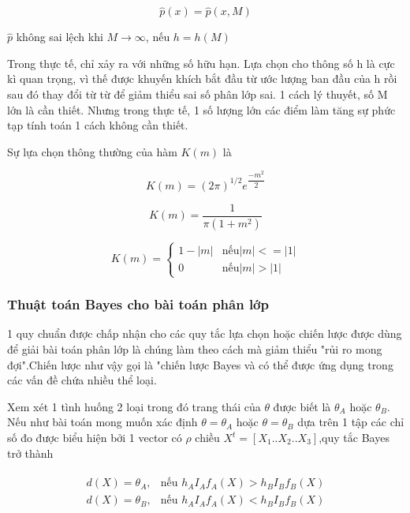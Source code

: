 \begin{equation}
	\hat{p}(x)=\hat{p}(x,M)
\end{equation}

$\hat{p}$  không sai lệch khi $M \rightarrow \infty$, nếu $h=h(M)$

Trong thực tế, chỉ xảy ra với những số hữu hạn. Lựa chọn cho thông số h là cực kì quan trọng, vì thế được khuyến khích bắt đầu từ ước lượng ban đầu của h rồi sau đó thay đổi từ từ để giảm thiểu sai số phân lớp sai. 1 cách lý thuyết, số M lớn là cần thiết. Nhưng trong thực tế, 1 số lượng lớn các điểm làm tăng sự phức tạp tính toán 1 cách không cần thiết.

\vspace{\baselineskip}
Sự lựa chọn thông thường của hàm $K(m)$ là

\begin{equation}
	K(m)=(2\pi)^{1/2}e^{\dfrac{-m^2}{2}}
\end{equation}

\begin{equation}
	K(m)=\dfrac{1}{\pi (1+m^2)}
\end{equation}

$$
K(m)=
\begin{cases}
	1-|m| & \text{nếu} |m|<=|1|\\
	0 & \text{nếu} |m|>|1|
\end{cases}
$$

\subsubsection{Thuật toán Bayes cho bài toán phân lớp}
1 quy chuẩn được chấp nhận cho các quy tắc lựa chọn hoặc chiến lược được dùng để giải bài toán phân lớp là chúng làm theo cách mà giảm thiểu "rủi ro mong đợi".Chiến lược như vậy gọi là "chiến lược Bayes và có thể được ứng dụng trong các vấn đề chứa nhiều thể loại.
 
\vspace{\baselineskip}
Xem xét 1 tình huống 2 loại trong đó trang thái của $\theta$ được biết là $\theta_A$ hoặc $\theta_B$. Nếu như bài toán mong muốn xác định $\theta = \theta_A$ hoặc $\theta = \theta_B$ dựa trên 1 tập các chỉ số đo được biểu hiện bởi 1 vector có $\rho$ chiều $X^t = [X_1..X_2..X_3]$,quy tắc Bayes trở thành \cite{bay}

\begin{align}
	\begin{split}
		d(X) = \theta_A , & \text{nếu $h_A I_A f_A (X) > h_B I_B f_B (X)$} \\
		d(X) = \theta_B , & \text{nếu $h_A I_A f_A (X) < h_B I_B f_B (X)$}
	\end{split}
\end{align}

